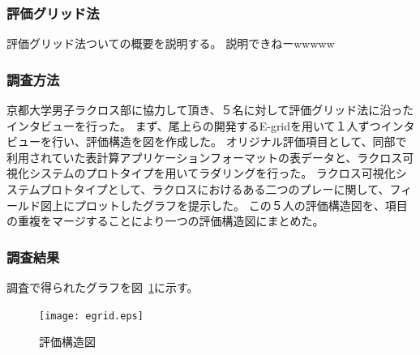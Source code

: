 \documentclass[sotsuron]{kuee}
\begin{document}
			\subsubsection{評価グリッド法}
				評価グリッド法ついての概要を説明する。
				説明できねーwwwww
			\subsubsection{調査方法}
				京都大学男子ラクロス部に協力して頂き、５名に対して評価グリッド法に沿ったインタビューを行った。
				まず、尾上らの開発するE-gridを用いて１人ずつインタビューを行い、評価構造を図を作成した。
				オリジナル評価項目として、同部で利用されていた表計算アプリケーションフォーマットの表データと、ラクロス可視化システムのプロトタイプを用いてラダリングを行った。
				ラクロス可視化システムプロトタイプとして、ラクロスにおけるある二つのプレーに関して、フィールド図上にプロットしたグラフを提示した。
				この５人の評価構造図を、項目の重複をマージすることにより一つの評価構造図にまとめた。
			\subsubsection{調査結果}	
				調査で得られたグラフを図~\ref{fig:egrid}に示す。
					\begin{figure}
						\begin{center}
							\texttt{[image: egrid.eps]}
						\end{center}
						\caption{評価構造図}
				  		\label{fig:egrid}
					\end{figure}
\end{document}
